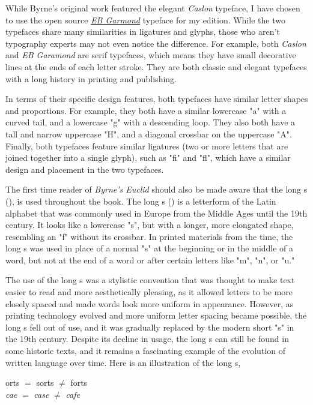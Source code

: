 \documentclass[twoside,12pt]{report}
\begin{document}
While Byrne's original work featured the elegant \textit{Caslon} typeface, I have chosen to use the open source \href{https://github.com/georgd/EB-Garamond}{\textit{EB Garmond}} typeface for my edition. While the two typefaces share many similarities in ligatures and glyphs, those who aren't typography experts may not even notice the difference.  For example, both \textit{Caslon} and \textit{EB Garamond} are serif typefaces, which means they have small decorative lines at the ends of each letter stroke. They are both classic and elegant typefaces with a long history in printing and publishing.

In terms of their specific design features, both typefaces have similar letter shapes and proportions. For example, they both have a similar lowercase "a" with a curved tail, and a lowercase "g" with a descending loop. They also both have a tall and narrow uppercase "H", and a diagonal crossbar on the uppercase "A".  Finally, both typefaces feature similar ligatures (two or more letters that are joined together into a single glyph), such as "fi" and "fl", which have a similar design and placement in the two typefaces.

The first time reader of \textit{Byrne's Euclid} should also be made aware that the long s ({\color{cred}{ſ}}), is used throughout the book. The long s ({\color{cred}{ſ}}) is a letterform of the Latin alphabet that was commonly used in Europe from the Middle Ages until the 19th century. It looks like a lowercase "s", but with a longer, more elongated shape, resembling an "f" without its crossbar. In printed materials from the time, the long s was used in place of a normal "s" at the beginning or in the middle of a word, but not at the end of a word or after certain letters like "m", "n", or "u."

The use of the long s was a stylistic convention that was thought to make text easier to read and more aesthetically pleasing, as it allowed letters to be more closely spaced and made words look more uniform in appearance. However, as printing technology evolved and more uniform letter spacing became possible, the long s fell out of use, and it was gradually replaced by the modern short "s" in the 19th century. Despite its decline in usage, the long s can still be found in some historic texts, and it remains a fascinating example of the evolution of written language over time.  Here is an illustration of the long s,
\begin{center}
  {\color{cred}{ſ}}orts $=$ sorts $\neq$ forts\\
  \textit{ca{\color{cred}{ſ}}e} $=$ \textit{case} $\neq$ \textit{cafe}
\end{center}
\end{document}
